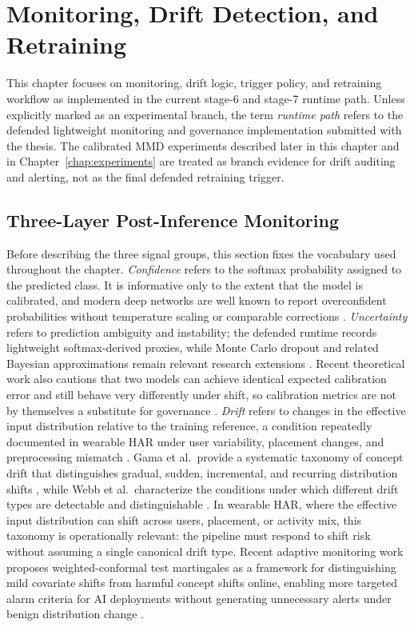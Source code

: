 \chapter{Monitoring, Drift Detection, and Retraining}
\label{chap:monitoring}

This chapter focuses on monitoring, drift logic, trigger policy, and retraining workflow as implemented in the current stage-6 and stage-7 runtime path. Unless explicitly marked as an experimental branch, the term \emph{runtime path} refers to the defended lightweight monitoring and governance implementation submitted with the thesis. The calibrated MMD experiments described later in this chapter and in Chapter~\ref{chap:experiments} are treated as branch evidence for drift auditing and alerting, not as the final defended retraining trigger.

\section{Three-Layer Post-Inference Monitoring}

Before describing the three signal groups, this section fixes the vocabulary used throughout the chapter. \emph{Confidence} refers to the softmax probability assigned to the predicted class. It is informative only to the extent that the model is calibrated, and modern deep networks are well known to report overconfident probabilities without temperature scaling or comparable corrections \cite{guo2017calibration}. \emph{Uncertainty} refers to prediction ambiguity and instability; the defended runtime records lightweight softmax-derived proxies, while Monte Carlo dropout and related Bayesian approximations remain relevant research extensions \cite{gal2016dropout}. Recent theoretical work also cautions that two models can achieve identical expected calibration error and still behave very differently under shift, so calibration metrics are not by themselves a substitute for governance \cite{blasiok2024calibration}. \emph{Drift} refers to changes in the effective input distribution relative to the training reference, a condition repeatedly documented in wearable HAR under user variability, placement changes, and preprocessing mismatch \cite{dhekane2024transfer,wang2024enhancing,akbari2020personalizing}. Gama et al.\ provide a systematic taxonomy of concept drift that distinguishes gradual, sudden, incremental, and recurring distribution shifts \cite{gama2014survey}, while Webb et al.\ characterize the conditions under which different drift types are detectable and distinguishable \cite{webb2016characterizing}. In wearable HAR, where the effective input distribution can shift across users, placement, or activity mix, this taxonomy is operationally relevant: the pipeline must respond to shift risk without assuming a single canonical drift type. Recent adaptive monitoring work proposes weighted-conformal test martingales as a framework for distinguishing mild covariate shifts from harmful concept shifts online, enabling more targeted alarm criteria for AI deployments without generating unnecessary alerts under benign distribution change \cite{prinster2025watch}.


